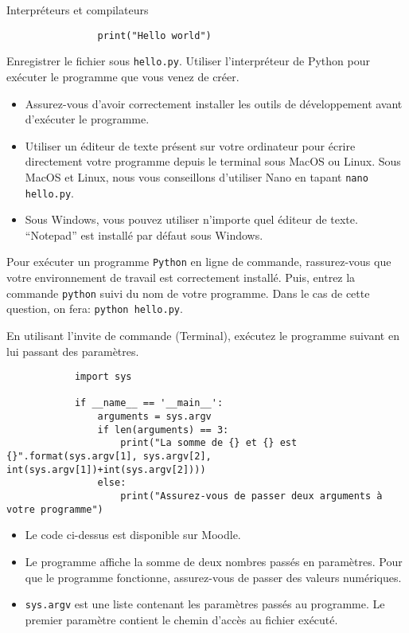 \begin{section}{Interpréteurs et compilateurs}
\begin{Exercice}[10 minutes]
\begin{lstlisting}
                print("Hello world")\end{lstlisting}
        Enregistrer le fichier sous \lstinline{hello.py}. Utiliser l'interpréteur de Python pour exécuter le programme que vous venez de créer.
    \end{Exercice}
    \begin{conseil}
        \begin{itemize}
            \item Assurez-vous d'avoir correctement installer les outils de développement avant d'exécuter le programme.
            \item Utiliser un éditeur de texte présent sur votre ordinateur pour écrire directement votre programme depuis le terminal sous MacOS ou Linux. Sous MacOS et Linux, nous vous conseillons d'utiliser Nano en tapant \lstinline{nano hello.py}.
            \item Sous Windows, vous pouvez utiliser n'importe quel éditeur de texte. ``Notepad'' est installé par défaut sous Windows.
        \end{itemize}
    \end{conseil}
    \begin{solution}
        Pour exécuter un programme \lstinline{Python} en ligne de commande, rassurez-vous que votre environnement de travail est correctement installé. Puis, entrez la commande \lstinline{python} suivi du nom de votre programme. 
        Dans le cas de cette question, on fera: \lstinline{python hello.py}.
    \end{solution}
    
    \begin{Exercice}[10 minutes]
        En utilisant l'invite de commande (Terminal), exécutez le programme suivant en lui passant des paramètres.
        \begin{lstlisting}
            import sys

            if __name__ == '__main__':
                arguments = sys.argv
                if len(arguments) == 3:
                    print("La somme de {} et {} est {}".format(sys.argv[1], sys.argv[2], int(sys.argv[1])+int(sys.argv[2])))
                else:
                    print("Assurez-vous de passer deux arguments à votre programme")\end{lstlisting}

        \begin{conseil}
            \begin{itemize}
                \item Le code ci-dessus est disponible sur Moodle.
                \item Le programme affiche la somme de deux nombres passés en paramètres. Pour que le programme fonctionne, assurez-vous de passer des valeurs numériques.
                \item \lstinline{sys.argv} est une liste contenant les paramètres passés au programme. Le premier paramètre contient le chemin d'accès au fichier exécuté.
            \end{itemize}
        \end{conseil}


\end{Exercice}
\end{section}
